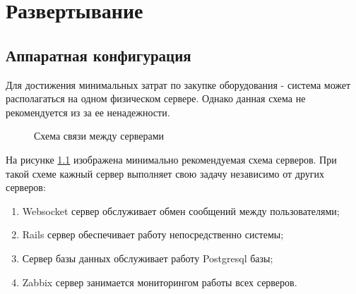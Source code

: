 \newpage
\chapter{Развертывание}
\section{Аппаратная конфигурация}
Для достижения минимальных затрат по закупке оборудования - система может
располагаться на одном физическом сервере. Однако данная схема не рекомендуется
из за ее ненадежности.

\begin{figure}[h]
\caption{Схема связи между серверами}
\label{ris:hardware_configuration}
\end{figure}

На рисунке \ref{ris:hardware_configuration} изображена минимально рекомендуемая
схема серверов. При такой схеме кажный сервер выполняет свою задачу независимо
от других серверов:
\begin{enumerate}
  \item Websocket сервер обслуживает обмен сообщений между пользователями;
  \item Rails сервер обеспечивает работу непосредственно системы;
  \item Сервер базы данных обслуживает работу Postgresql базы;
  \item Zabbix сервер занимается мониторингом работы всех серверов.
\end{enumerate}







